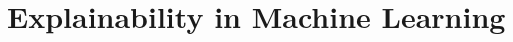 \chapter{Explainability in Machine Learning} 
\label{Explainability} 

\citet{SelvarajuCDVPB20} \citet{ChenLTBRS19} \citet{LiLCR18}